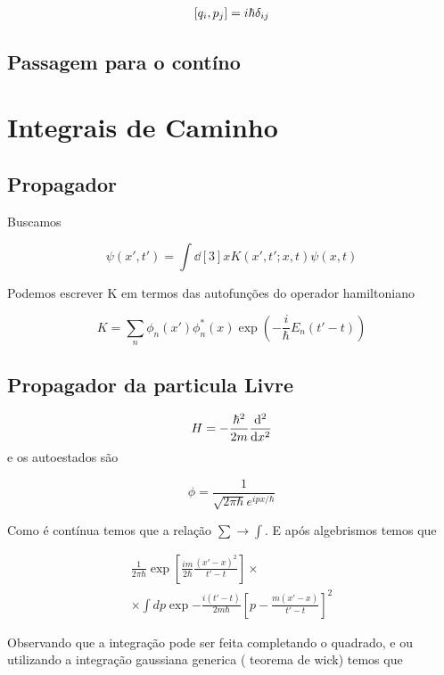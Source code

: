 \documentclass{book}
\begin{document}
	\begin{align}
		\comm{q_i}{p_j}=i\hbar \delta_{ij}
	\end{align}



\section{Passagem para o contíno}

\chapter{Integrais de Caminho}


\section{Propagador}
Buscamos

\begin{equation}
	\psi(x',t')= \int \dd[3]{x}K(x',t';x,t) \psi(x,t)
\end{equation}

Podemos escrever K em termos das autofunções do operador hamiltoniano 

\begin{equation}
	K= \sum_n \phi_n(x')\phi^*_n(x)\exp(-\frac{i}{\hbar}E_n(t'-t)) \label{propagador-representacao-energia}
\end{equation}


\section{Propagador da particula Livre}
\begin{equation}
	H=-\frac{\hbar^2}{2m} \dv[2]{x}
\end{equation}
e os autoestados são

 \begin{equation}
 	\phi= \frac{1}{\sqrt{2\pi\hbar}e^{ipx/\hbar}}
 \end{equation}
 
 Como é contínua temos que a relação  $\sum \to \int$. E após algebrismos temos que
 
 
 \begin{align}
 	\frac{1}{2\pi \hbar} \exp[\frac{im}{2\hbar} \frac{(x'-x)^2}{t'-t}] \times \\ \times \int dp \exp{-\frac{i(t'-t)}{2m\hbar}[p-\frac{m(x'-x)}{t'-t}]^2}
 \end{align} 
 
 Observando que a integração pode ser feita completando o quadrado, e ou utilizando a integração gaussiana generica ( teorema de wick) temos que
 
\end{document}

